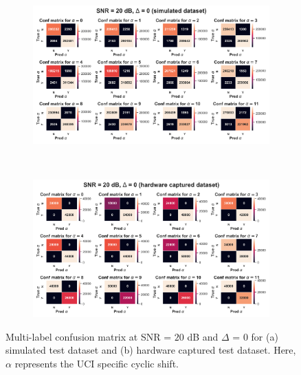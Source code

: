 \documentclass[journal]{IEEEtran}
\begin{document}
\begin{figure}[ht!]
    \captionsetup{justification=justified}
     \centering
     \begin{subfigure}[b]{0.48\textwidth}
         \centering
         \includegraphics[width=\textwidth]{Figures/Conf_mtx_multi_label_SNR_20_dB_Max_off_0_train_sim_test_sim.png}
         \caption{}
         \label{fig: cm_multilabel_snr_20_off_0_sim}
     \end{subfigure}
     \\
     \begin{subfigure}[b]{0.48\textwidth}
         \centering
         \includegraphics[width=\textwidth]{Figures/Conf_mtx_multi_label_SNR_20_dB_Max_off_0_train_sim_test_hw.png}
         \caption{}
         \label{fig: cm_multilabel_snr_20_off_0_hw}
     \end{subfigure}
        \caption{Multi-label confusion matrix at SNR = $20$ dB and $\Delta$ = $0$ for (a) simulated test dataset and (b) hardware captured test dataset. Here, $\alpha$ represents the UCI specific cyclic shift.}
        \label{fig: cm_multilabel_snr_20_off_0}
\end{figure}
\end{document}
